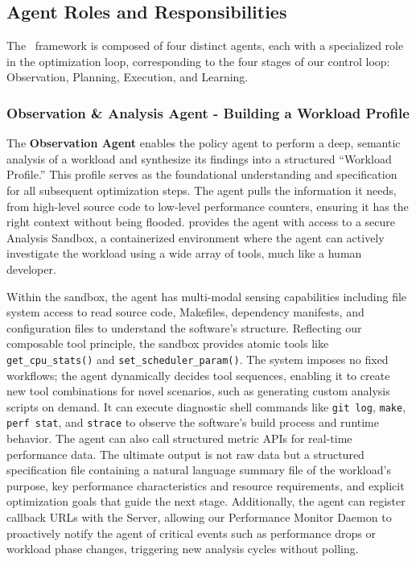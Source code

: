 \subsection{Agent Roles and Responsibilities}
The \agent\ framework is composed of four distinct agents, each with a specialized role in the optimization loop, corresponding to the four stages of our control loop: Observation, Planning, Execution, and Learning.

\subsubsection{Observation \& Analysis Agent - Building a Workload Profile}

The \textbf{Observation Agent} enables the policy agent to perform a deep, semantic analysis of a workload and synthesize its findings into a structured ``Workload Profile.'' This profile serves as the foundational understanding and specification for all subsequent optimization steps. The agent pulls the information it needs, from high-level source code to low-level performance counters, ensuring it has the right context without being flooded. \sys provides the agent with access to a secure Analysis Sandbox, a containerized environment where the agent can actively investigate the workload using a wide array of tools, much like a human developer.

Within the sandbox, the agent has multi-modal sensing capabilities including file system access to read source code, Makefiles, dependency manifests, and configuration files to understand the software's structure. Reflecting our composable tool principle, the sandbox provides atomic tools like \texttt{get\_cpu\_stats()} and \texttt{set\_scheduler\_param()}. The system imposes no fixed workflows; the agent dynamically decides tool sequences, enabling it to create new tool combinations for novel scenarios, such as generating custom analysis scripts on demand. It can execute diagnostic shell commands like \texttt{git log}, \texttt{make}, \texttt{perf stat}, and \texttt{strace} to observe the software's build process and runtime behavior. The agent can also call structured metric APIs for real-time performance data. The ultimate output is not raw data but a structured specification file containing a natural language summary file of the workload's purpose, key performance characteristics and resource requirements, and explicit optimization goals that guide the next stage. Additionally, the agent can register callback URLs with the \sys Server, allowing our Performance Monitor Daemon to proactively notify the agent of critical events such as performance drops or workload phase changes, triggering new analysis cycles without polling.

